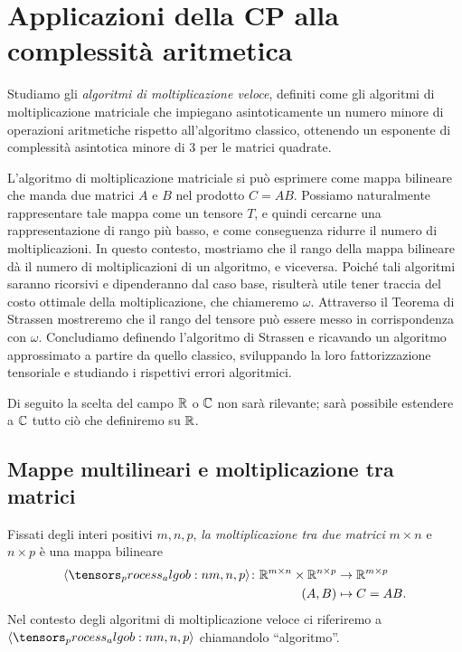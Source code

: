 \chapter{Applicazioni della CP alla complessità aritmetica}
\label{chp:matmul}

Studiamo gli \emph{algoritmi di moltiplicazione veloce},
definiti come gli algoritmi di moltiplicazione matriciale che
impiegano asintoticamente un numero minore di operazioni aritmetiche rispetto all'algoritmo
classico, ottenendo un esponente di complessità asintotica minore di $ 3 $ per le matrici quadrate.

L'algoritmo di moltiplicazione matriciale si può esprimere come mappa bilineare che manda due matrici $ A
$ e $ B $ nel prodotto $ C = AB $. Possiamo naturalmente rappresentare tale mappa come un tensore $ T $, e
quindi cercarne una rappresentazione di rango più basso, e come conseguenza ridurre il numero di moltiplicazioni.
In questo contesto, mostriamo che il rango della mappa bilineare dà il numero di moltiplicazioni di un algoritmo, e
viceversa. Poiché tali algoritmi saranno ricorsivi e dipenderanno dal caso base, risulterà utile
tener traccia del costo ottimale della moltiplicazione, che chiameremo $ \omega $. Attraverso il
Teorema di Strassen mostreremo che il rango del tensore può essere messo in corrispondenza con $ \omega $.
Concludiamo definendo l'algoritmo di Strassen e ricavando un algoritmo approssimato a partire da quello
classico, sviluppando la loro fattorizzazione tensoriale e studiando i rispettivi errori algoritmici.

\begin{remark}
	Di seguito la scelta del campo $\mathbb{R}$ o $\mathbb{C}$ non sarà rilevante; sarà possibile estendere a $\mathbb{C}$ tutto ciò che definiremo su $\mathbb{R}$.
\end{remark}

\section{Mappe multilineari e moltiplicazione tra matrici}
\label{sec:tensor_bil}

\begin{definition}
	Fissati degli interi positivi $ m,n,p $, \emph{la moltiplicazione tra due matrici} $  m\times n $ e $ n \times p $ è una mappa bilineare
	\begin{equation*}
		\begin{aligned}
			\algob{m,n,p} \colon \R^{m\times n} \times \R^{n\times p} & \to \R^{m \times p} \\
			(A,B)                                                     & \mapsto C = AB.
		\end{aligned}
	\end{equation*}
	Nel contesto degli algoritmi di moltiplicazione veloce ci riferiremo a $ \algob{m,n,p} $ chiamandolo ``algoritmo''.
\end{definition}


